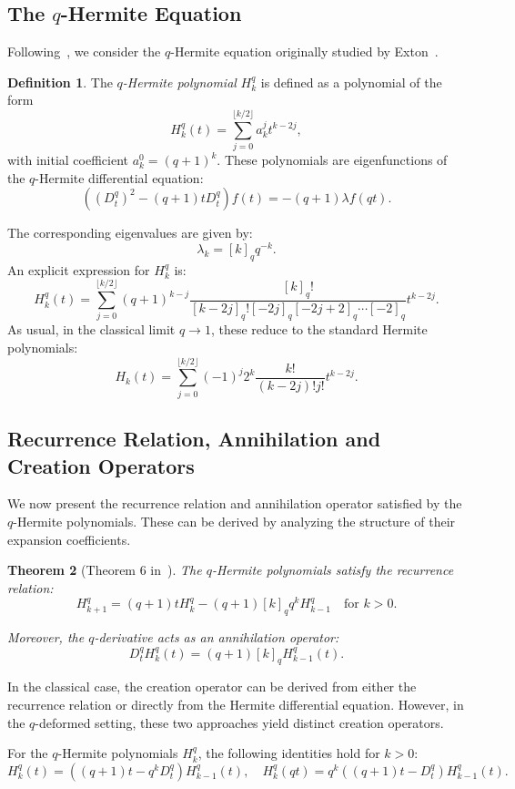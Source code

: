 \documentclass[10pt]{amsart}
\theoremstyle{plain}
\newtheorem{theorem}{Theorem}[section]
\theoremstyle{definition}
\newtheorem{definition}[theorem]{Definition}
\begin{document}
\subsection{The $q$-Hermite Equation}
Following~\cite{CoSo2010}, we consider the $q$-Hermite equation originally studied by Exton~\cite{Exton1980}.

\begin{definition}
The \textit{$q$-Hermite polynomial} $H_k^q$ is defined as a polynomial of the form
\[
H_k^q(t) = \sum_{j=0}^{\lfloor k/2 \rfloor} a_k^j t^{k - 2j},
\]
with initial coefficient $ a_k^0 = (q+1)^k $. These polynomials are eigenfunctions of the $q$-Hermite differential equation:
\[
\left( \left(D_t^q\right)^2 - (q+1)t D_t^q \right)f(t) = -(q+1)\lambda f(qt).
\]
\end{definition}
The corresponding eigenvalues are given by:
\[
\lambda_k = [k]_q q^{-k}.
\]
An explicit expression for $ H_k^q $ is:
\[
H_k^q(t) = \sum_{j=0}^{\lfloor k/2 \rfloor} (q+1)^{k-j} \frac{[k]_q!}{[k - 2j]_q! [-2j]_q [-2j+2]_q \cdots [-2]_q} t^{k - 2j}.
\]
As usual, in the classical limit $ q \to 1 $, these reduce to the standard Hermite polynomials:
\[
H_k(t) = \sum_{j=0}^{\lfloor k/2 \rfloor} (-1)^j 2^k \frac{k!}{(k - 2j)! j!} t^{k - 2j}.
\]

\subsection{Recurrence Relation, Annihilation and Creation Operators}
We now present the recurrence relation and annihilation operator satisfied by the $q$-Hermite polynomials. These can be derived by analyzing the structure of their expansion coefficients.

\begin{theorem}[Theorem 6 in~\cite{CoSo2010}]
The $q$-Hermite polynomials satisfy the recurrence relation:
\[
H_{k+1}^q = (q+1)tH_k^q - (q+1)[k]_q q^k H_{k-1}^q \quad \text{for } k > 0.
\]

Moreover, the $q$-derivative acts as an annihilation operator:
\[
D_t^q H_k^q(t) = (q+1)[k]_q H_{k-1}^q(t).
\]
\end{theorem}

In the classical case, the creation operator can be derived from either the recurrence relation or directly from the Hermite differential equation. However, in the $q$-deformed setting, these two approaches yield distinct creation operators.

For the $q$-Hermite polynomials $ H_k^q $, the following identities hold for $ k > 0 $:
\[
H_k^q(t) = \left( (q+1)t - q^k D_t^q \right) H_{k-1}^q(t), \quad
H_k^q(qt) = q^k \left( (q+1)t - D_t^q \right) H_{k-1}^q(t).
\]
\end{document}
